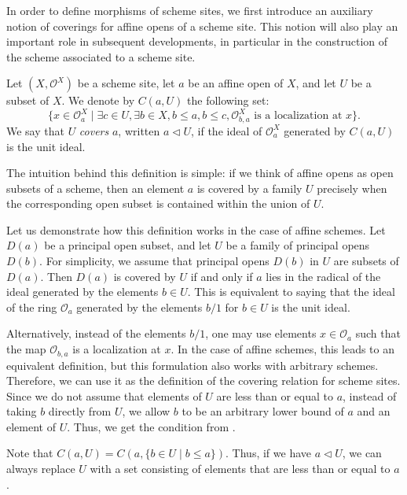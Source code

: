 \documentclass[reqno]{amsart}
\theoremstyle{definition}
\theoremstyle{remark}
\numberwithin{figure}{section}
\newcommand{\cover}{\triangleleft}
\begin{document}
In order to define morphisms of scheme sites, we first introduce an auxiliary notion of coverings for affine opens of a scheme site.
This notion will also play an important role in subsequent developments, in particular in the construction of the scheme associated to a scheme site.

\begin{defn}[cover]
Let $(X, \mathcal{O}^X)$ be a scheme site, let $a$ be an affine open of $X$, and let $U$ be a subset of $X$.
We denote by $C(a,U)$ the following set:
\[ \{ x \in \mathcal{O}^X_a \mid \exists c \in U, \exists b \in X, b \leq a, b \leq c, \mathcal{O}^X_{b,a} \text{ is a localization at } x \}. \]
We say that $U$ \emph{covers} $a$, written $a \cover U$, if the ideal of $\mathcal{O}^X_a$ generated by $C(a,U)$ is the unit ideal.
\end{defn}

The intuition behind this definition is simple: if we think of affine opens as open subsets of a scheme,
then an element $a$ is covered by a family $U$ precisely when the corresponding open subset is contained within the union of $U$.

Let us demonstrate how this definition works in the case of affine schemes.
Let $D(a)$ be a principal open subset, and let $U$ be a family of principal opens $D(b)$.
For simplicity, we assume that principal opens $D(b)$ in $U$ are subsets of $D(a)$.
Then $D(a)$ is covered by $U$ if and only if $a$ lies in the radical of the ideal generated by the elements $b \in U$.
This is equivalent to saying that the ideal of the ring $\mathcal{O}_a$ generated by the elements $b/1$ for $b \in U$ is the unit ideal.

Alternatively, instead of the elements $b/1$, one may use elements $x \in \mathcal{O}_a$ such that the map $\mathcal{O}_{b,a}$ is a localization at $x$.
In the case of affine schemes, this leads to an equivalent definition, but this formulation also works with arbitrary schemes.
Therefore, we can use it as the definition of the covering relation for scheme sites.
Since we do not assume that elements of $U$ are less than or equal to $a$,
instead of taking $b$ directly from $U$, we allow $b$ to be an arbitrary lower bound of $a$ and an element of $U$.
Thus, we get the condition from .

\begin{remark}
Note that $C(a,U) = C(a, \{ b \in U \mid b \leq a \})$.
Thus, if we have $a \cover U$, we can always replace $U$ with a set consisting of elements that are less than or equal to $a$.
\end{remark}
\end{document}

